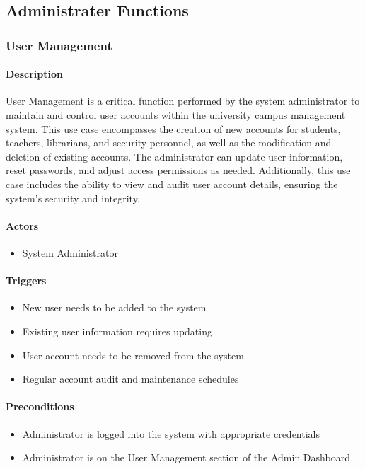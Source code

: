 \subsection{Administrater Functions}
\subsubsection{User Management}

\paragraph{Description}
User Management is a critical function performed by the system administrator to maintain and control user accounts within the university campus management system. This use case encompasses the creation of new accounts for students, teachers, librarians, and security personnel, as well as the modification and deletion of existing accounts. The administrator can update user information, reset passwords, and adjust access permissions as needed. Additionally, this use case includes the ability to view and audit user account details, ensuring the system's security and integrity.

\paragraph{Actors}
\begin{itemize}
    \item System Administrator
\end{itemize}

\paragraph{Triggers}
\begin{itemize}
    \item New user needs to be added to the system
    \item Existing user information requires updating
    \item User account needs to be removed from the system
    \item Regular account audit and maintenance schedules
\end{itemize}

\paragraph{Preconditions}
\begin{itemize}
    \item Administrator is logged into the system with appropriate credentials
    \item Administrator is on the User Management section of the Admin Dashboard
\end{itemize}

